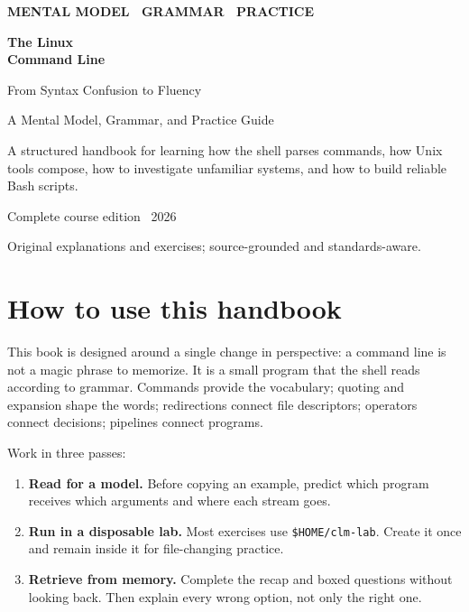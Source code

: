 \documentclass[11pt,oneside,openany]{book}
\begin{document}
\frontmatter
\hypersetup{pageanchor=false}
\begin{titlepage}
  \pagecolor{Navy}
  \color{white}
  \vspace*{17mm}
  {\Large\sffamily\bfseries MENTAL MODEL \textbullet\ GRAMMAR \textbullet\ PRACTICE\par}
  \vspace{14mm}
  {\fontsize{34}{40}\selectfont\bfseries The Linux\\Command Line\par}
  \vspace{5mm}
  {\fontsize{22}{28}\selectfont From Syntax Confusion to Fluency\par}
  \vspace{10mm}
  {\Large A Mental Model, Grammar, and Practice Guide\par}
  \vfill
  \begin{tcolorbox}[colback=white!8!Navy,colframe=Cyan,boxrule=1.2pt,arc=3mm]
    \color{white}\large
    A structured handbook for learning how the shell parses commands, how Unix tools compose, how to investigate unfamiliar systems, and how to build reliable Bash scripts.
  \end{tcolorbox}
  \vfill
  {\large Complete course edition \textbullet\ 2026\par}
  {\normalsize Original explanations and exercises; source-grounded and standards-aware.\par}
\end{titlepage}
\hypersetup{pageanchor=true}
\nopagecolor
\color{Ink}

\chapter*{How to use this handbook}
This book is designed around a single change in perspective: a command line is not a magic phrase to memorize. It is a small program that the shell reads according to grammar. Commands provide the vocabulary; quoting and expansion shape the words; redirections connect file descriptors; operators connect decisions; pipelines connect programs.

Work in three passes:
\begin{enumerate}
  \item \textbf{Read for a model.} Before copying an example, predict which program receives which arguments and where each stream goes.
  \item \textbf{Run in a disposable lab.} Most exercises use \texttt{\$HOME/clm-lab}. Create it once and remain inside it for file-changing practice.
  \item \textbf{Retrieve from memory.} Complete the recap and boxed questions without looking back. Then explain every wrong option, not only the right one.
\end{enumerate}
\end{document}
